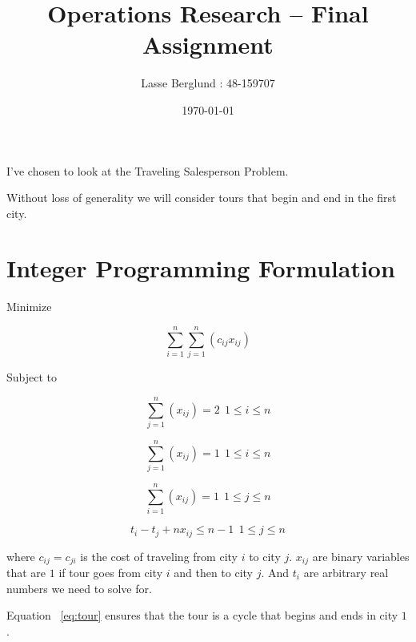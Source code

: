 \documentclass[12pt]{report}
\title{Operations Research -- Final Assignment}
\author{Lasse Berglund : 48-159707}
\date{\today}
\begin{document}
\maketitle

I've chosen to look at the Traveling Salesperson Problem.

Without loss of generality we will consider tours that begin and end in the first city.

\section*{Integer Programming Formulation}

Minimize

\begin{equation} \label{eq:obj}
  \sum_{i=1}^n \sum_{j=1}^n (c_{ij} x_{ij})
\end{equation}

Subject to

\begin{equation} \label{eq:path_enter_leaves}
  \sum_{j=1}^n (x_{ij}) = 2 \ \ 1\le i \le n
\end{equation}

\begin{equation} \label{eq:out_degree}
  \sum_{j=1}^n (x_{ij}) = 1 \ \ 1\le i \le n
\end{equation}

\begin{equation} \label{eq:in_degree}
  \sum_{i=1}^n (x_{ij}) = 1 \ \ 1\le j \le n
\end{equation}

\begin{equation} \label{eq:tour}
  t_i - t_j + nx_{ij} \le n-1 \ \ 1\le j \le n
\end{equation}

where $c_{ij} = c_{ji}$ is the cost of traveling from city $i$ to city $j$. $x_{ij}$ are binary variables that are $1$ if tour goes from city $i$ and then to city $j$. And $t_i$ are arbitrary real numbers we need to solve for.


Equation ~\ref{eq:tour} ensures that the tour is a cycle that begins and ends in city $1$.
\end{document}
